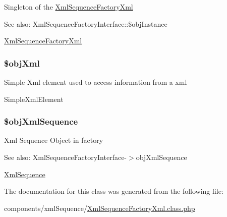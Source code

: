 Singleton of the \hyperlink{class_xml_sequence_factory_xml}{XmlSequenceFactoryXml}

\begin{Desc}
\item[See also:]XmlSequenceFactoryInterface::\$objInstance\end{Desc}
\hyperlink{class_xml_sequence_factory_xml}{XmlSequenceFactoryXml} \hypertarget{class_xml_sequence_factory_xml_bc4e6de2df0815964fa9983816b76475}{
\subsubsection[{\$objXml}]{\setlength{\rightskip}{0pt plus 5cm}\$objXml}}
\label{class_xml_sequence_factory_xml_bc4e6de2df0815964fa9983816b76475}


Simple Xml element used to access information from a xml

SimpleXmlElement \hypertarget{class_xml_sequence_factory_xml_eefa469c1b13fe1fec040c910b720034}{
\subsubsection[{\$objXmlSequence}]{\setlength{\rightskip}{0pt plus 5cm}\$objXmlSequence}}
\label{class_xml_sequence_factory_xml_eefa469c1b13fe1fec040c910b720034}


Xml Sequence Object in factory

\begin{Desc}
\item[See also:]XmlSequenceFactoryInterface-$>$objXmlSequence\end{Desc}
\hyperlink{class_xml_sequence}{XmlSequence} 

The documentation for this class was generated from the following file:\begin{CompactItemize}
\item 
components/xmlSequence/\hyperlink{_xml_sequence_factory_xml_8class_8php}{XmlSequenceFactoryXml.class.php}\end{CompactItemize}
